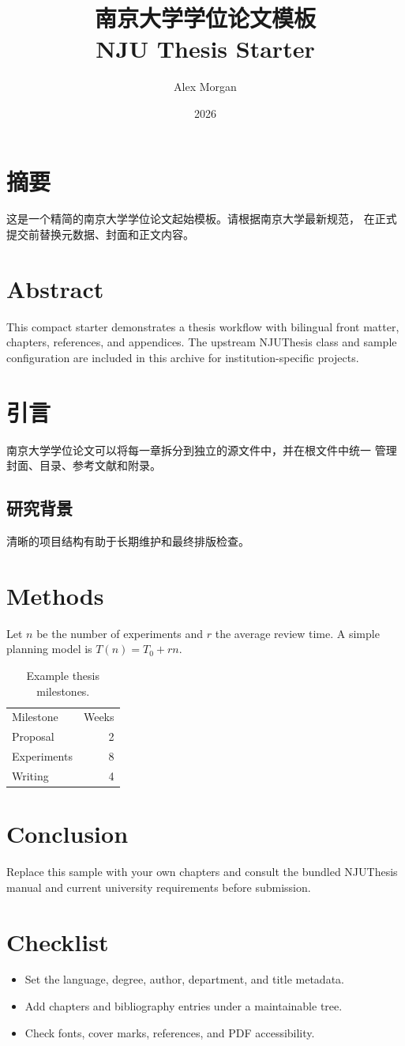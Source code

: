 \documentclass[11pt,a4paper,oneside]{book}
\title{南京大学学位论文模板\\NJU Thesis Starter}
\author{Alex Morgan}
\date{2026}
\begin{document}
\frontmatter
\maketitle
\chapter*{摘要}
这是一个精简的南京大学学位论文起始模板。请根据南京大学最新规范，
在正式提交前替换元数据、封面和正文内容。
\chapter*{Abstract}
This compact starter demonstrates a thesis workflow with bilingual front matter,
chapters, references, and appendices. The upstream NJUThesis class and sample
configuration are included in this archive for institution-specific projects.
\tableofcontents
\mainmatter
\chapter{引言}
南京大学学位论文可以将每一章拆分到独立的源文件中，并在根文件中统一
管理封面、目录、参考文献和附录。
\section{研究背景}
清晰的项目结构有助于长期维护和最终排版检查。
\chapter{Methods}
Let $n$ be the number of experiments and $r$ the average review time. A simple
planning model is $T(n)=T_0+rn$.
\begin{table}[ht]
  \centering
  \caption{Example thesis milestones.}
  \begin{tabular}{lr}
    Milestone & Weeks \\
    Proposal & 2 \\
    Experiments & 8 \\
    Writing & 4 \\
  \end{tabular}
\end{table}
\chapter{Conclusion}
Replace this sample with your own chapters and consult the bundled NJUThesis
manual and current university requirements before submission.
\appendix
\chapter{Checklist}
\begin{itemize}
  \item Set the language, degree, author, department, and title metadata.
  \item Add chapters and bibliography entries under a maintainable tree.
  \item Check fonts, cover marks, references, and PDF accessibility.
\end{itemize}
\end{document}
